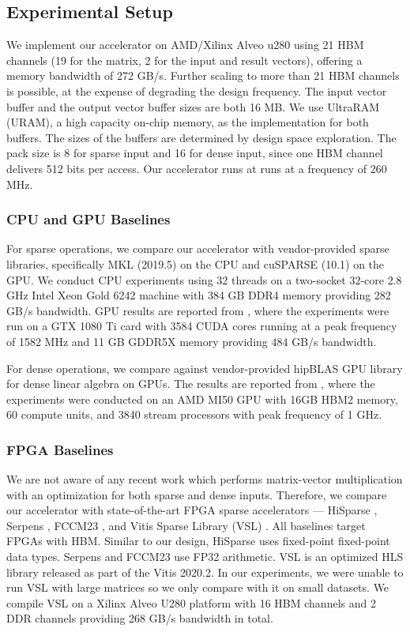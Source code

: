 \documentclass[manuscript,screen,review]{acmart}
\begin{document}
\subsection{Experimental Setup}
We implement our accelerator on AMD/Xilinx Alveo u280 using 21 HBM channels (19 for the matrix, 2 for the input and result vectors), offering a memory bandwidth of 272 GB/s. Further scaling to more than 21 HBM channels is possible, at the expense of degrading the design frequency.
The input vector buffer and the output vector buffer sizes are both 16 MB. We use UltraRAM (URAM), a high capacity on-chip memory, as the implementation for both buffers. The sizes of the buffers are determined by design space exploration. The pack size is 8 for sparse input and 16 for dense input, since one HBM channel delivers 512 bits per access. Our accelerator runs at runs at a frequency of 260 MHz. 

\subsubsection{CPU and GPU Baselines}

For sparse operations, we compare our accelerator with vendor-provided sparse libraries, specifically MKL (2019.5) on the CPU and cuSPARSE (10.1) on the GPU. We conduct CPU experiments using 32 threads on a two-socket 32-core 2.8 GHz Intel Xeon Gold 6242 machine with 384 GB DDR4 memory providing 282 GB/s bandwidth. GPU results are reported from \cite{hisparse}, where the experiments were run on a GTX 1080 Ti card with 3584 CUDA cores running at a peak frequency of 1582 MHz and 11 GB GDDR5X memory providing 484 GB/s bandwidth.

For dense operations, we compare against vendor-provided hipBLAS GPU library for dense linear algebra on GPUs. The results are reported from \cite{gpu-dense}, where the experiments were conducted on an AMD MI50 GPU with 16GB HBM2 memory, 60 compute units, and 3840 stream processors with peak frequency of 1 GHz.


\subsubsection{FPGA Baselines}

We are not aware of any recent work which performs matrix-vector multiplication with an optimization for both sparse and dense inputs. Therefore, we compare our accelerator with state-of-the-art FPGA sparse accelerators — HiSparse \cite{hisparse}, Serpens \cite{serpens}, FCCM23 \cite{fccm-spmv}, and Vitis Sparse Library (VSL) \cite{Xilinx2021}. All baselines target FPGAs with HBM. Similar to our design, HiSparse uses fixed-point fixed-point data types. Serpens and FCCM23 use FP32 arithmetic. VSL is an optimized HLS library released as part of the Vitis 2020.2. In our experiments, we were unable to run VSL with large matrices so we only compare with it on small datasets. We compile VSL on a Xilinx Alveo U280 platform with
16 HBM channels and 2 DDR channels providing 268 GB/s bandwidth in total.
\end{document}
